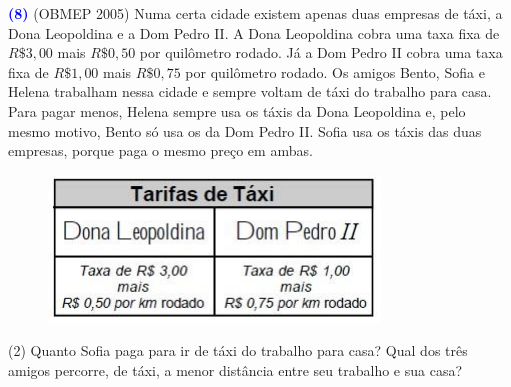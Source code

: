 \documentclass[12pt, a4paper]{article}
\newcommand{\negrito}[1]{\mbox{\boldmath{$#1$}}}
\begin{document}
\textcolor{blue}{\bf(8)} (OBMEP 2005) Numa certa cidade existem apenas duas empresas de táxi, a Dona Leopoldina e a Dom
Pedro II. A Dona Leopoldina cobra uma taxa fixa de $R\$ 3,00$ mais $R\$ 0,50$ por
quilômetro rodado. Já a Dom Pedro II cobra uma taxa fixa de $R\$ 1,00$ mais $R\$ 0,75$ por quilômetro rodado. Os amigos Bento, Sofia e Helena trabalham nessa cidade e sempre voltam de táxi do trabalho para casa. Para pagar menos, Helena sempre usa os táxis da Dona Leopoldina e, pelo mesmo motivo, Bento só usa os da Dom Pedro II. Sofia usa os táxis das duas empresas, porque paga o mesmo preço em ambas.
\begin{figure}[!h]
    \centering
 \includegraphics[scale=1.1]{Figuras/19enc2ciclo1.png}
\end{figure}
\begin{tasks}[counter-format={(tsk[a])},label-width=3.6ex, label-format = {\bfseries}, column-sep = {0pt}](2)
\task[\textcolor{Floresta}{$\negrito{(a)} $}] Quanto Sofia paga para ir de táxi do trabalho para casa?
\task[\textcolor{Floresta}{$\negrito{(b)} $}] Qual dos três amigos percorre, de táxi, a menor distância entre seu trabalho e
sua casa?
\end{tasks}
\end{document}
